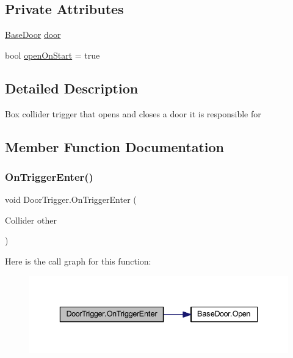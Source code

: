 \subsection*{Private Attributes}
\begin{DoxyCompactItemize}
\item 
\mbox{\hyperlink{class_base_door}{Base\+Door}} \mbox{\hyperlink{class_door_trigger_a592b30ac7c1c4b719d6a90fa96fbb046}{door}}
\item 
bool \mbox{\hyperlink{class_door_trigger_ac3f14399b44bff7efd22f9ce4d4ef5c6}{open\+On\+Start}} = true
\end{DoxyCompactItemize}


\subsection{Detailed Description}
Box collider trigger that opens and closes a door it is responsible for 



\subsection{Member Function Documentation}
\mbox{\label{class_door_trigger_a9cad842a8527ec462aae682c8c50b118}} 
\subsubsection{\texorpdfstring{On\+Trigger\+Enter()}{OnTriggerEnter()}}
{\footnotesize\ttfamily void Door\+Trigger.\+On\+Trigger\+Enter (\begin{DoxyParamCaption}\item[{Collider}]{other }\end{DoxyParamCaption})\hspace{0.3cm}{\ttfamily [private]}}

Here is the call graph for this function\+:\nopagebreak
\begin{figure}[H]
\begin{center}
\leavevmode
\includegraphics[width=336pt]{class_door_trigger_a9cad842a8527ec462aae682c8c50b118_cgraph}
\end{center}
\end{figure}
\mbox{\label{class_door_trigger_adee54426b691466c5d667b912816bb56}} 
